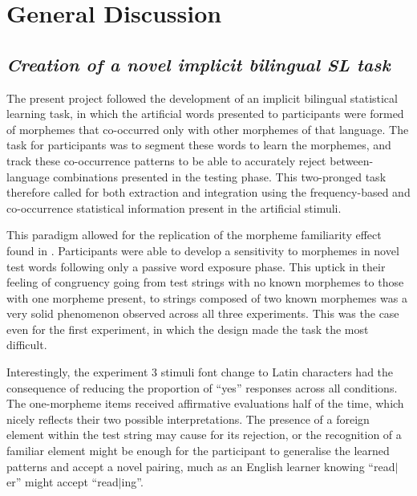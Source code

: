 \section{General Discussion}
\label{GenDiscussion}
\setlength{\parindent}{20pt}
\justifying

\subsection{\large{\emph{Creation of a novel implicit bilingual SL task}}}
\noindent
The present project followed the development of an implicit bilingual statistical learning task, in which the artificial words presented to participants were formed of morphemes that co-occurred only with other morphemes of that language. The task for participants was to segment these words to learn the morphemes, and track these co-occurrence patterns to be able to accurately reject between-language combinations presented in the testing phase. This two-pronged task therefore called for both extraction and integration using the frequency-based and co-occurrence statistical information present in the artificial stimuli.

This paradigm allowed for the replication of the morpheme familiarity effect found in \textcite{Lelonkiewicz2020}. Participants were able to develop a sensitivity to morphemes in novel test words following only a passive word exposure phase. This uptick in their feeling of congruency going from test strings with no known morphemes to those with one morpheme present, to strings composed of two known morphemes was a very solid phenomenon observed across all three experiments. This was the case even for the first experiment, in which the design made the task the most difficult. 

Interestingly, the experiment 3 stimuli font change to Latin characters had the consequence of reducing the proportion of ``yes'' responses across all conditions. The one-morpheme items received affirmative evaluations half of the time, which nicely reflects their two possible interpretations. The presence of a foreign element within the test string may cause for its rejection, or the recognition of a familiar element might be enough for the participant to generalise the learned patterns and accept a novel pairing, much as an English learner knowing ``read$\vert$er'' might accept ``read$\vert$ing''.

